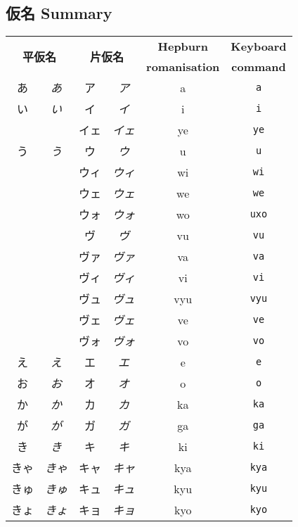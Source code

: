 \documentclass[../nihongo-gakushuu-kyouzai.tex]{subfiles}
\begin{document}
\subsection{仮名 Summary}
\begin{longtable}[c]{@{}cccccc@{}}
    \toprule
    \multicolumn{2}{c}{\multirow{2}{*}{\textbf{平仮名}}} & \multicolumn{2}{c}{\multirow{2}{*}{\textbf{片仮名}}} & \textbf{Hepburn} & \textbf{Keyboard} \\
    \multicolumn{2}{c}{} & \multicolumn{2}{c}{} & \textbf{romanisation} & \textbf{command} \\* \midrule
    \endhead
    あ & \emph{あ} & ア & \emph{ア} & a & \texttt{a} \\
    い & \emph{い} & イ & \emph{イ} & i & \texttt{i}\\
 & \emph{} & イェ & \emph{イェ} & ye & \texttt{ye} \\
    う & \emph{う} & ウ & \emph{ウ} & u & \texttt{u} \\
 & \emph{} & ウィ & \emph{ウィ} & wi & \texttt{wi} \\
 & \emph{} & ウェ & \emph{ウェ} & we & \texttt{we} \\
 & \emph{} & ウォ & \emph{ウォ} & wo & \color{red} \texttt{uxo} \\
 & \emph{} & ヴ & \emph{ヴ} & vu & \texttt{vu} \\
 & \emph{} & ヴァ & \emph{ヴァ} & va & \texttt{va} \\
 & \emph{} & ヴィ & \emph{ヴィ} & vi & \texttt{vi} \\
 & \emph{} & ヴュ & \emph{ヴュ} & vyu & \texttt{vyu} \\
 & \emph{} & ヴェ & \emph{ヴェ} & ve & \texttt{ve} \\
 & \emph{} & ヴォ & \emph{ヴォ} & vo & \texttt{vo} \\
    え & \emph{え} & エ & \emph{エ} & e & \texttt{e} \\
    お & \emph{お} & オ & \emph{オ} & o & \texttt{o} \\
    か & \emph{か} & カ & \emph{カ} & ka & \texttt{ka} \\
    が & \emph{が} & ガ & \emph{ガ} & ga & \texttt{ga} \\
    き & \emph{き} & キ & \emph{キ} & ki & \texttt{ki} \\
    きゃ & \emph{きゃ} & キャ & \emph{キャ} & kya & \texttt{kya} \\
    きゅ & \emph{きゅ} & キュ & \emph{キュ} & kyu & \texttt{kyu} \\
    きょ & \emph{きょ} & キョ & \emph{キョ} & kyo & \texttt{kyo} \\

\end{longtable}
\end{document}
